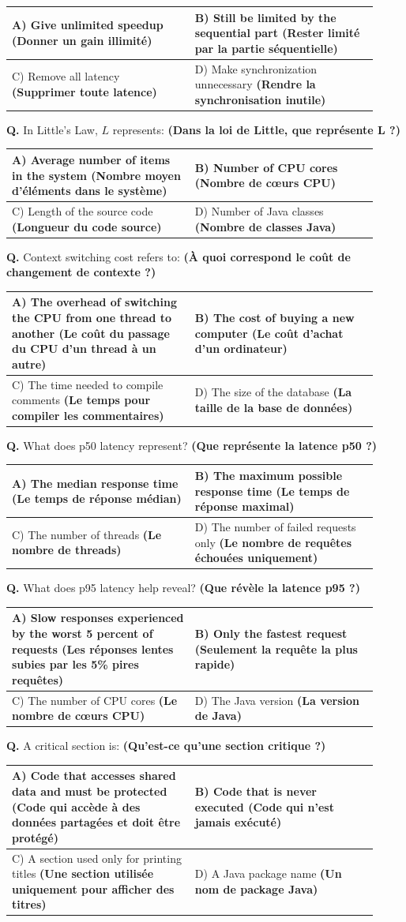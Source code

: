 \documentclass[11pt,a4paper]{article}
\newcounter{qnum}
\newcommand{\Q}{%
	\stepcounter{qnum}%
	\noindent\textbf{Q\theqnum. }%
}
\newcommand{\choices}[4]{%
	\setlength{\tabcolsep}{4pt}%
	\renewcommand{\arraystretch}{1.15}%
	\begin{tabular}{|p{0.46\linewidth}|p{0.46\linewidth}|}
		\hline
		A) #1 & B) #2 \\ \hline
		C) #3 & D) #4 \\ \hline
	\end{tabular}%
}
\begin{document}
\choices
{Give unlimited speedup \textbf{(Donner un gain illimité)}}
{Still be limited by the sequential part \textbf{(Rester limité par la partie séquentielle)}}
{Remove all latency \textbf{(Supprimer toute latence)}}
{Make synchronization unnecessary \textbf{(Rendre la synchronisation inutile)}}

\Q In Little's Law, \(L\) represents: \textbf{(Dans la loi de Little, que représente L ?) }

\choices
{Average number of items in the system \textbf{(Nombre moyen d’éléments dans le système)}}
{Number of CPU cores \textbf{(Nombre de cœurs CPU)}}
{Length of the source code \textbf{(Longueur du code source)}}
{Number of Java classes \textbf{(Nombre de classes Java)}}

\Q Context switching cost refers to: \textbf{(À quoi correspond le coût de changement de contexte ?) }

\choices
{The overhead of switching the CPU from one thread to another \textbf{(Le coût du passage du CPU d’un thread à un autre)}}
{The cost of buying a new computer \textbf{(Le coût d’achat d’un ordinateur)}}
{The time needed to compile comments \textbf{(Le temps pour compiler les commentaires)}}
{The size of the database \textbf{(La taille de la base de données)}}

\Q What does p50 latency represent? \textbf{(Que représente la latence p50 ?) }

\choices
{The median response time \textbf{(Le temps de réponse médian)}}
{The maximum possible response time \textbf{(Le temps de réponse maximal)}}
{The number of threads \textbf{(Le nombre de threads)}}
{The number of failed requests only \textbf{(Le nombre de requêtes échouées uniquement)}}
	\Q What does p95 latency help reveal? \textbf{(Que révèle la latence p95 ?) }
	
	\choices
	{Slow responses experienced by the worst 5 percent of requests \textbf{(Les réponses lentes subies par les 5\% pires requêtes)}}
	{Only the fastest request \textbf{(Seulement la requête la plus rapide)}}
	{The number of CPU cores \textbf{(Le nombre de cœurs CPU)}}
	{The Java version \textbf{(La version de Java)}}
	
	\Q A critical section is: \textbf{(Qu’est-ce qu’une section critique ?) }
	
	\choices
	{Code that accesses shared data and must be protected \textbf{(Code qui accède à des données partagées et doit être protégé)}}
	{Code that is never executed \textbf{(Code qui n’est jamais exécuté)}}
	{A section used only for printing titles \textbf{(Une section utilisée uniquement pour afficher des titres)}}
	{A Java package name \textbf{(Un nom de package Java)}}
	
\end{document}
